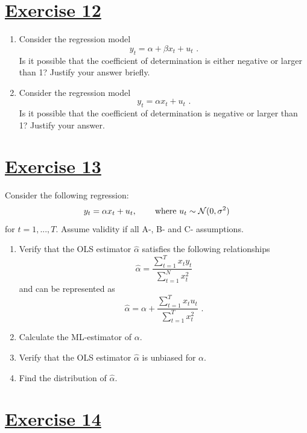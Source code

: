 \documentclass[captions=tableheading, 12pt, headings=small, parskip=half]{scrartcl}
\begin{document}
\section*{\underline{Exercise 12}}
\begin{enumerate}[label = \alph*)]
	\item Consider the regression model \[y_t = \alpha + \beta x_t + u_t\text{ .}\]Is it possible that the coefficient of determination is either negative or larger than 1? Justify your answer briefly.
	\item Consider the regression model \[y_t = \alpha x_t + u_t\text{ .}\]Is it possible that the coefficient of determination is negative or larger than 1? Justify your answer.
\end{enumerate}


\section*{\underline{Exercise 13}}
Consider the following regression:
\[
y_t = \alpha x_t + u_t\text{, \qquad where } u_t\sim \mathcal{N}(0, \sigma^2)
\]for $t = 1,...,T$. Assume validity if all A-, B- and C- assumptions.
\begin{enumerate}[label = \alph*)]
	\item Verify that the OLS estimator $\hat{\alpha}$ satisfies the following relationships
	\[
	\hat{\alpha} = \frac{\sum_{t = 1}^T{x_ty_t}}{\sum_{t = 1}^N{x_t^2}}
	\]and can be represented as
	\[
	\hat{\alpha} = \alpha + \frac{\sum_{t = 1}^T{x_tu_t}}{\sum_{t = 1}^T{x_t^2}} \text{ .}
	\]
	\item Calculate the ML-estimator of $\alpha$.
	\item Verify that the OLS estimator $\hat{\alpha}$ is unbiased for $\alpha$.
	\item Find the distribution of $\hat{\alpha}$.
\end{enumerate}

\section*{\underline{Exercise 14}}
\end{document}
